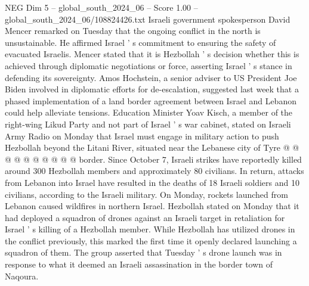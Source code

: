 \begin{textsample}{NEG Dim 5 – global\_south\_2024\_06 – Score 1.00 – global\_south\_2024\_06/108824426.txt}
Israeli government spokesperson David Mencer remarked on Tuesday that the ongoing conflict in the north is unsustainable.
He affirmed Israel ' s commitment to ensuring the safety of evacuated Israelis.
Mencer stated that it is Hezbollah ' s decision whether this is achieved through diplomatic negotiations or force, asserting Israel ' s stance in defending its sovereignty.
Amos Hochstein, a senior adviser to US President Joe Biden involved in diplomatic efforts for de-escalation, suggested last week that a phased implementation of a land border agreement between Israel and Lebanon could help alleviate tensions.
Education Minister Yoav Kisch, a member of the right-wing Likud Party and not part of Israel ' s war cabinet, stated on Israeli Army Radio on Monday that Israel must engage in military action to push Hezbollah beyond the Litani River, situated near the Lebanese city of Tyre @ @ @ @ @ @ @ @ @ @ border.
Since October 7, Israeli strikes have reportedly killed around 300 Hezbollah members and approximately 80 civilians.
In return, attacks from Lebanon into Israel have resulted in the deaths of 18 Israeli soldiers and 10 civilians, according to the Israeli military.
On Monday, rockets launched from Lebanon caused wildfires in northern Israel.
Hezbollah stated on Monday that it had deployed a squadron of drones against an Israeli target in retaliation for Israel ' s killing of a Hezbollah member.
While Hezbollah has utilized drones in the conflict previously, this marked the first time it openly declared launching a squadron of them.
The group asserted that Tuesday ' s drone launch was in response to what it deemed an Israeli assassination in the border town of Naqoura.

\end{textsample}
